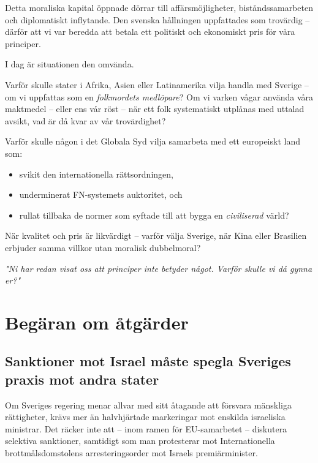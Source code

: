 \documentclass[12pt]{article}
\begin{document}
Detta moraliska kapital öppnade dörrar till affärsmöjligheter, biståndssamarbeten och diplomatiskt inflytande. Den svenska hållningen uppfattades som trovärdig – därför att vi var beredda att betala ett politiskt och ekonomiskt pris för våra principer.

I dag är situationen den omvända.

Varför skulle stater i Afrika, Asien eller Latinamerika vilja handla med Sverige – om vi uppfattas som en \textit{folkmordets medlöpare}?  
Om vi varken vågar använda våra maktmedel – eller ens vår röst – när ett folk systematiskt utplånas med uttalad avsikt, vad är då kvar av vår trovärdighet?

Varför skulle någon i det Globala Syd vilja samarbeta med ett europeiskt land som:

\begin{itemize}
  \item svikit den internationella rättsordningen,
  \item underminerat FN-systemets auktoritet, och
  \item rullat tillbaka de normer som syftade till att bygga en \textit{civiliserad} värld?
\end{itemize}

När kvalitet och pris är likvärdigt – varför välja Sverige, när Kina eller Brasilien erbjuder samma villkor utan moralisk dubbelmoral?

\textit{"Ni har redan visat oss att principer inte betyder något. Varför skulle vi då gynna er?"}



\section*{Begäran om åtgärder}
\subsection*{Sanktioner mot Israel måste spegla Sveriges praxis mot andra stater}

Om Sveriges regering menar allvar med sitt åtagande att försvara mänskliga rättigheter, krävs mer än halvhjärtade markeringar mot enskilda israeliska ministrar. Det räcker inte att – inom ramen för EU-samarbetet – diskutera selektiva sanktioner, samtidigt som man protesterar mot Internationella brottmålsdomstolens arresteringsorder mot Israels premiärminister.
\end{document}
